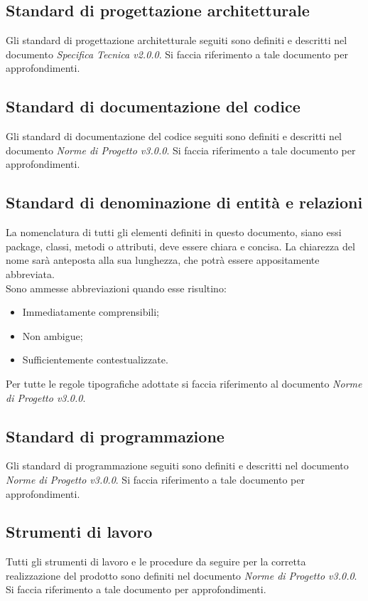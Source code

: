 \subsection{Standard di progettazione architetturale}
Gli standard di progettazione architetturale seguiti sono definiti e descritti nel documento \textit{Specifica Tecnica v2.0.0}. Si faccia riferimento a tale
documento per approfondimenti.

\subsection{Standard di documentazione del codice}
Gli standard di documentazione del codice seguiti sono definiti e descritti nel documento \textit{Norme di Progetto v3.0.0}. Si faccia riferimento a tale
documento per approfondimenti.

\subsection{Standard di denominazione di entità e relazioni}
La nomenclatura di tutti gli elementi definiti in questo documento, siano essi package, classi, metodi o attributi, deve essere chiara e concisa. 
La chiarezza del nome sarà anteposta alla sua lunghezza, che potrà essere appositamente abbreviata. \\
\noindent Sono ammesse abbreviazioni quando esse risultino:
\begin{itemize}
	 \item Immediatamente comprensibili;
	 \item Non ambigue;
	 \item Sufficientemente contestualizzate.
\end{itemize}
Per tutte le regole tipografiche adottate si faccia riferimento al documento \textit{Norme di Progetto v3.0.0}.

\subsection{Standard di programmazione}
Gli standard di programmazione seguiti sono definiti e descritti nel documento \textit{Norme di Progetto v3.0.0}. Si faccia riferimento a tale
documento per approfondimenti.

\subsection{Strumenti di lavoro}
Tutti gli strumenti di lavoro e le procedure da seguire per la corretta realizzazione del prodotto sono definiti nel documento \textit{Norme di Progetto v3.0.0}.
Si faccia riferimento a tale documento per approfondimenti.

